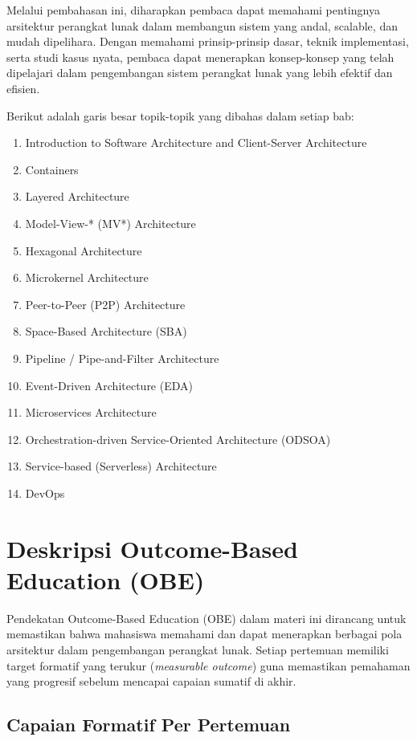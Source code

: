 Melalui pembahasan ini, diharapkan pembaca dapat memahami pentingnya arsitektur perangkat lunak dalam membangun sistem yang andal, scalable, dan mudah dipelihara. Dengan memahami prinsip-prinsip dasar, teknik implementasi, serta studi kasus nyata, pembaca dapat menerapkan konsep-konsep yang telah dipelajari dalam pengembangan sistem perangkat lunak yang lebih efektif dan efisien.

Berikut adalah garis besar topik-topik yang dibahas dalam setiap bab:
\begin{enumerate}
\item Introduction to Software Architecture and Client-Server Architecture
\item Containers
\item Layered Architecture
\item Model-View-* (MV*) Architecture
\item Hexagonal Architecture
\item Microkernel Architecture
\item Peer-to-Peer (P2P) Architecture

\item Space-Based Architecture (SBA)
\item Pipeline / Pipe-and-Filter Architecture
\item Event-Driven Architecture (EDA)
\item Microservices Architecture
\item Orchestration-driven Service-Oriented Architecture (ODSOA)
\item Service-based (Serverless) Architecture
\item DevOps
\end{enumerate}


\section{Deskripsi Outcome-Based Education (OBE)}

Pendekatan Outcome-Based Education (OBE) dalam materi ini dirancang untuk memastikan bahwa mahasiswa memahami dan dapat menerapkan berbagai pola arsitektur dalam pengembangan perangkat lunak. Setiap pertemuan memiliki target formatif yang terukur (\textit{measurable outcome}) guna memastikan pemahaman yang progresif sebelum mencapai capaian sumatif di akhir.

\subsection{Capaian Formatif Per Pertemuan}


